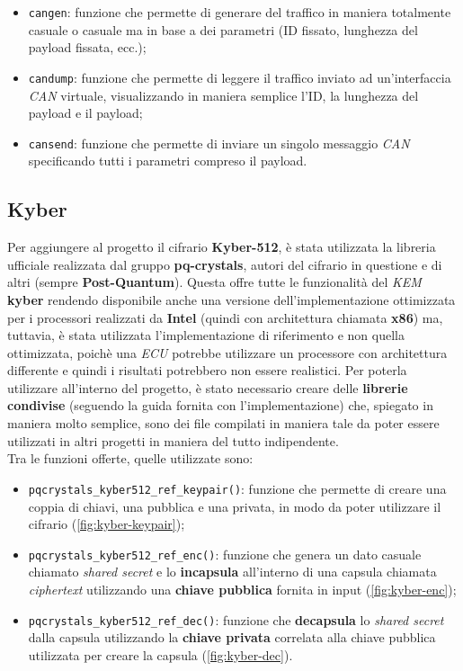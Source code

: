 \begin{itemize}
    \item \texttt{cangen}: funzione che permette di generare del traffico in maniera totalmente casuale o casuale ma in base a dei parametri (ID fissato, lunghezza del payload fissata, ecc.);
    \item \texttt{candump}: funzione che permette di leggere il traffico inviato ad un'interfaccia \emph{CAN} virtuale, visualizzando in maniera semplice l'ID, la lunghezza del payload e il payload;
    \item \texttt{cansend}: funzione che permette di inviare un singolo messaggio \emph{CAN} specificando tutti i parametri compreso il payload.
\end{itemize}

\subsection{Kyber}
Per aggiungere al progetto il cifrario \textbf{Kyber-512}, è stata utilizzata la libreria ufficiale realizzata dal gruppo \textbf{pq-crystals}, autori del cifrario in questione e di altri (sempre \textbf{Post-Quantum}). Questa offre tutte le funzionalità del \emph{KEM} \textbf{kyber} rendendo disponibile anche una versione dell'implementazione ottimizzata per i processori realizzati da \textbf{Intel} (quindi con architettura chiamata \textbf{x86}) ma, tuttavia, è stata utilizzata l'implementazione di riferimento e non quella ottimizzata, poichè una \emph{ECU} potrebbe utilizzare un processore con architettura differente e quindi i risultati potrebbero non essere realistici. Per poterla utilizzare all'interno del progetto, è stato necessario creare delle \textbf{librerie condivise} (seguendo la guida fornita con l'implementazione) che, spiegato in maniera molto semplice, sono dei file compilati in maniera tale da poter essere utilizzati in altri progetti in maniera del tutto indipendente.\\
Tra le funzioni offerte, quelle utilizzate sono:
\begin{itemize}
    \item \texttt{pqcrystals\_kyber512\_ref\_keypair()}: funzione che permette di creare una coppia di chiavi, una pubblica e una privata, in modo da poter utilizzare il cifrario (\autoref{fig:kyber-keypair});
    \item \texttt{pqcrystals\_kyber512\_ref\_enc()}: funzione che genera un dato casuale chiamato \emph{shared secret} e lo \textbf{incapsula} all'interno di una capsula chiamata \emph{ciphertext} utilizzando una \textbf{chiave pubblica} fornita in input (\autoref{fig:kyber-enc});
    \item \texttt{pqcrystals\_kyber512\_ref\_dec()}: funzione che \textbf{decapsula} lo \emph{shared secret} dalla capsula utilizzando la \textbf{chiave privata} correlata alla chiave pubblica utilizzata per creare la capsula (\autoref{fig:kyber-dec}).
\end{itemize}

